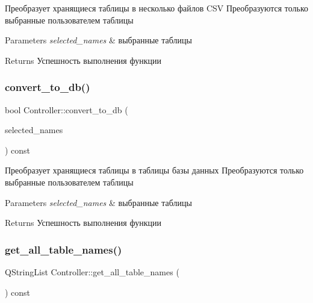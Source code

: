 Преобразует хранящиеся таблицы в несколько файлов C\+SV Преобразуются только выбранные пользователем таблицы 


\begin{DoxyParams}{Parameters}
{\em selected\+\_\+names} & выбранные таблицы \\
\hline
\end{DoxyParams}
\begin{DoxyReturn}{Returns}
Успешность выполнения функции 
\end{DoxyReturn}
\mbox{\label{class_controller_a1a767cfe7fa199f78b3043f4cd637c76}} 
\subsubsection{\texorpdfstring{convert\+\_\+to\+\_\+db()}{convert\_to\_db()}}
{\footnotesize\ttfamily bool Controller\+::convert\+\_\+to\+\_\+db (\begin{DoxyParamCaption}\item[{const Q\+String\+List \&}]{selected\+\_\+names }\end{DoxyParamCaption}) const}



Преобразует хранящиеся таблицы в таблицы базы данных Преобразуются только выбранные пользователем таблицы 


\begin{DoxyParams}{Parameters}
{\em selected\+\_\+names} & выбранные таблицы \\
\hline
\end{DoxyParams}
\begin{DoxyReturn}{Returns}
Успешность выполнения функции 
\end{DoxyReturn}
\mbox{\label{class_controller_af413760ea8c755a4bff82ff5f070ba17}} 
\subsubsection{\texorpdfstring{get\+\_\+all\+\_\+table\+\_\+names()}{get\_all\_table\_names()}}
{\footnotesize\ttfamily Q\+String\+List Controller\+::get\+\_\+all\+\_\+table\+\_\+names (\begin{DoxyParamCaption}{ }\end{DoxyParamCaption}) const}



